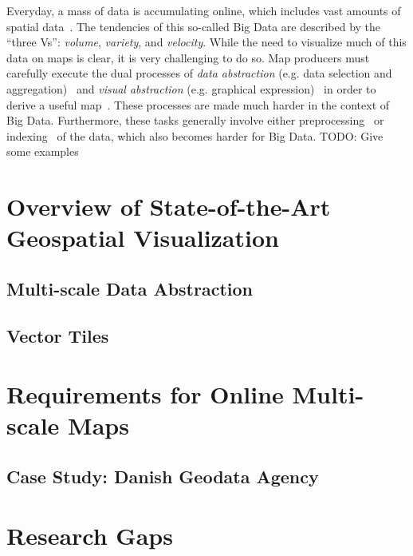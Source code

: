 \documentclass[11pt, oneside]{report}   	%
\begin{document}
Everyday, a mass of data is accumulating online, which includes vast amounts of spatial data~\cite{agrawal2012bigdata}. The tendencies of this so-called Big Data are described by the ``three Vs'': \emph{volume}, \emph{variety}, and \emph{velocity}. While the need to visualize much of this data on maps is clear, it is very challenging to do so. Map producers must carefully execute the dual processes of \emph{data abstraction} (e.g. data selection and aggregation)~\cite{haunert2006landcover,schmid2013opensciencemap} and \emph{visual abstraction} (e.g. graphical expression)~\cite{jacques1967semiologie} in order to derive a useful map~\cite{stolte2003multiscale,weibel1999generalising}. These processes are made much harder in the context of Big Data. Furthermore, these tasks generally involve either preprocessing~\cite{sarma2012fusiontables,kefaloukos2014declarative} or indexing~\cite{bereuter2013real,nutanong2012multiresolution} of the data, which also becomes harder for Big Data. TODO: Give some examples

\section{Overview of State-of-the-Art Geospatial Visualization}

\subsection{Multi-scale Data Abstraction}

\subsection{Vector Tiles}

\section{Requirements for Online Multi-scale Maps}
\subsection{Case Study: Danish Geodata Agency}

\section{Research Gaps}

\section{}
\end{document}
